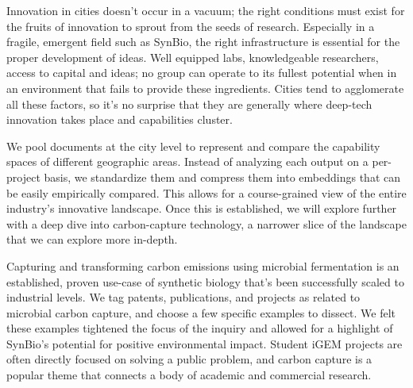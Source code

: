 \documentclass[12pt,a4paper]{article}
\begin{document}
	Innovation in cities doesn't occur in a vacuum; the right conditions must exist for the fruits of innovation to sprout from the seeds of research. Especially in a fragile, emergent field such as SynBio, the right infrastructure is essential for the proper development of ideas. Well equipped labs, knowledgeable researchers, access to capital and ideas; no group can operate to its fullest potential when in an environment that fails to provide these ingredients. Cities tend to agglomerate all these factors, so it's no surprise that they are generally where deep-tech innovation takes place and capabilities cluster.
	
	We pool documents at the city level to represent and compare the capability spaces of different geographic areas. Instead of analyzing each output on a per-project basis, we standardize them and compress them into embeddings that can be easily empirically compared. This allows for a course-grained view of the entire industry's innovative landscape. Once this is established, we will explore further with a deep dive into carbon-capture technology, a narrower slice of the landscape that we can explore more in-depth.
	
	Capturing and transforming carbon emissions using microbial fermentation is an established, proven use-case of synthetic biology that's been successfully scaled to industrial levels. We tag patents, publications, and projects as related to microbial carbon capture, and choose a few specific examples to dissect. We felt these examples tightened the focus of the inquiry and allowed for a highlight of SynBio's potential for positive environmental impact. Student iGEM projects are often directly focused on solving a public problem, and carbon capture is a popular theme that connects a body of academic and commercial research.
	
\end{document}
